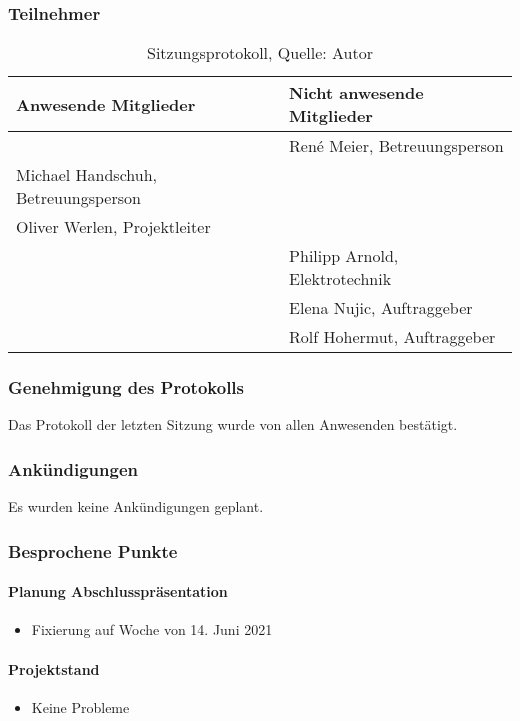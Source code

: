 \subsubsection{Teilnehmer}
\begin{table}[H]
	\setlength\extrarowheight{2pt} %
	\begin{tabularx}{\textwidth}{|X|X|}
		\hline
		\textbf{Anwesende Mitglieder} &  \textbf{Nicht anwesende Mitglieder} \\
		\hline
		& René Meier, Betreuungsperson  \\
		 Michael Handschuh, Betreuungsperson &   \\
		Oliver Werlen, Projektleiter &  \\
		& Philipp Arnold, Elektrotechnik  \\
		& Elena Nujic, Auftraggeber  \\
		& Rolf Hohermut, Auftraggeber  \\
		\hline
	\end{tabularx}
	\caption{ \label{tbl: Teilnehmerliste vom 12.05.2021}Sitzungsprotokoll, Quelle: Autor}
\end{table}
\subsubsection{Genehmigung des Protokolls}
Das Protokoll der letzten Sitzung wurde von allen Anwesenden bestätigt.
\subsubsection{Ankündigungen}
Es wurden keine Ankündigungen geplant.
\subsubsection{Besprochene Punkte}
\paragraph{Planung Abschlusspräsentation}
\begin{itemize}
	\item Fixierung auf Woche von 14. Juni 2021
\end{itemize}
\paragraph{Projektstand}
\begin{itemize}
	\item Keine Probleme 
\end{itemize}
